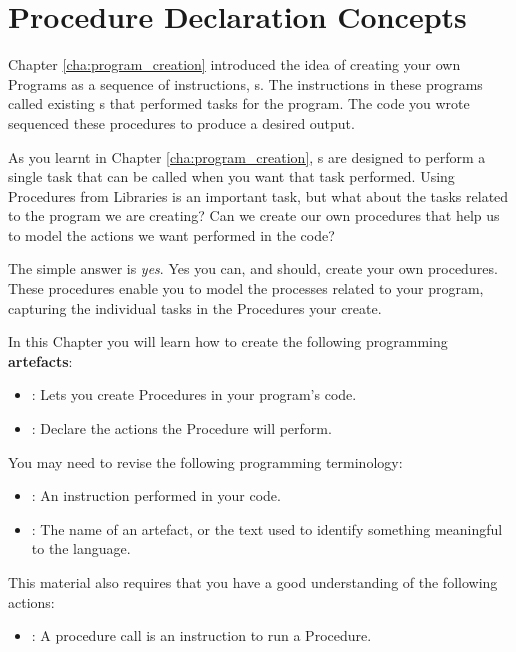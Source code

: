 \clearpage
\section{Procedure Declaration Concepts} %
\label{sec:procedure_declaration_concepts}

Chapter \ref{cha:program_creation}  introduced the idea of creating your own Programs as a sequence of instructions, s. The instructions in these programs called existing s that performed tasks for the program. The code you wrote sequenced these procedures to produce a desired output.

As you learnt in Chapter \ref{cha:program_creation}, s are designed to perform a single task that can be called when you want that task performed. Using Procedures from Libraries is an important task, but what about the tasks related to the program we are creating? Can we create our own procedures that help us to model the actions we want performed in the code?

The simple answer is \emph{yes}. Yes you can, and should, create your own procedures. These procedures enable you to model the processes related to your program, capturing the individual tasks in the Procedures your create. 

In this Chapter you will learn how to create the following programming \textbf{artefacts}:

\begin{itemize}
  \item {}: Lets you create Procedures in your program's code.
  \item {}: Declare the actions the Procedure will perform.
\end{itemize}

\bigskip

You may need to revise the following programming terminology:
\begin{itemize}
  \item {}: An instruction performed in your code.
  \item {}: The name of an artefact, or the text used to identify something meaningful to the language.
\end{itemize}

This material also requires that you have a good understanding of the following actions:
\begin{itemize}
  \item {}: A procedure call is an instruction to run a Procedure.
\end{itemize}

